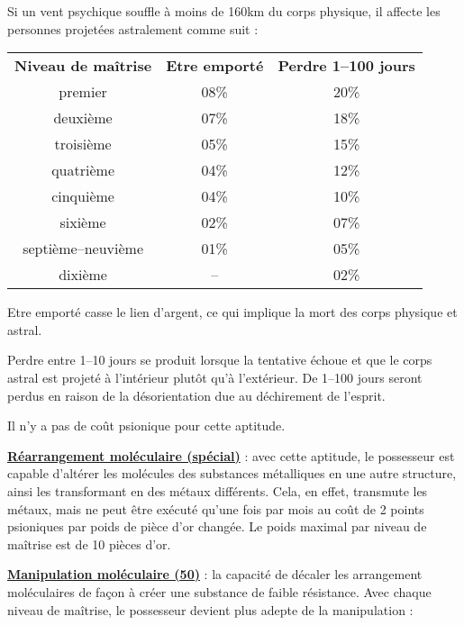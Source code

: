 \bigskip

Si un vent psychique souffle à moins de 160km du corps physique, il affecte les personnes projetées astralement comme suit :

\bigskip

\begin{tabular}{ccc}
\textbf{Niveau de maîtrise} & \textbf{Etre emporté} & \textbf{Perdre 1--100 jours} \\
premier            & 08\% & 20\% \\
deuxième           & 07\% & 18\% \\
troisième          & 05\% & 15\% \\
quatrième          & 04\% & 12\% \\
cinquième          & 04\% & 10\% \\
sixième            & 02\% & 07\% \\
septième--neuvième & 01\% & 05\% \\
dixième            & --   & 02\% \\
\end{tabular}

\medskip

Etre emporté casse le lien d'argent, ce qui implique la mort des corps physique et astral.

\bigskip

Perdre entre 1--10 jours se produit lorsque la tentative échoue et que le corps astral est projeté à l'intérieur plutôt qu'à l'extérieur. De 1--100 jours seront perdus en raison de la désorientation due au déchirement de l'esprit.

\bigskip

Il n'y a pas de coût psionique pour cette aptitude.

\bigskip

\label{guerrier-rearrange-mol}\textbf{\uline{Réarrangement moléculaire (spécial)}} : avec cette aptitude, le possesseur est capable d'altérer les molécules des substances métalliques en une autre structure, ainsi les transformant en des métaux différents. Cela, en effet, transmute les métaux, mais ne peut être exécuté qu'une fois par mois au coût de 2 points psioniques par poids de pièce d'or changée. Le poids maximal par niveau de maîtrise est de 10 pièces d'or.

\bigskip

\label{guerrier-manip-mol}\textbf{\uline{Manipulation moléculaire (50)}} : la capacité de décaler les arrangement moléculaires de façon à créer une substance de faible résistance. Avec chaque niveau de maîtrise, le possesseur devient plus adepte de la manipulation :

